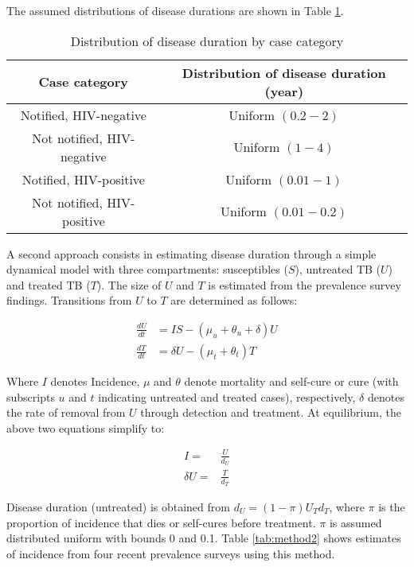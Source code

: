 The assumed distributions of disease durations are shown in Table \ref{tab:duration}.

\begin{table} 
    \label{tab:duration}
    \begin{tabular}{ c c }
        \hline
        Case category & Distribution of disease duration (year) \\ 
        \hline
        Notified, HIV-negative & Uniform $(0.2 - 2)$ \\ 
        Not notified, HIV-negative & Uniform $(1 - 4)$ \\ 
        Notified, HIV-positive & Uniform $(0.01 - 1)$ \\ 
        Not notified, HIV-positive & Uniform $(0.01 - 0.2)$ \\ 
        \hline
    \end{tabular} 
    \caption{Distribution of disease duration by case category} 
\end{table}



A second approach consists in estimating disease duration through a simple dynamical model with three compartments: susceptibles ($S$), untreated TB ($U$) and treated TB ($T$). The size of $U$ and $T$ is estimated from the prevalence survey findings. Transitions from $U$ to $T$ are determined as follows:

\begin{align*}
\frac{dU}{dt} &= I S - (\mu_u + \theta_u + \delta)U \\
\frac{dT}{dt} &= \delta U - (\mu_t + \theta_t) T
\end{align*}

Where $I$ denotes Incidence, $\mu$ and $\theta$ denote mortality and self-cure or cure (with subscripts $u$ and $t$ indicating untreated and treated cases), respectively, $\delta$ denotes the rate of removal from $U$ through detection and treatment. At equilibrium, the above two equations simplify to: 

\begin{align*}
I = &\frac{U}{d_U} \\
\delta U = &\frac{T}{d_T}
\end{align*}

Disease duration (untreated) is obtained from $d_U=(1-\pi)U_T d_T$, where $\pi$ is the proportion of incidence that dies or self-cures before treatment. $\pi$ is assumed distributed uniform with bounds 0 and 0.1. Table \ref{tab:method2} shows estimates of incidence from four recent prevalence surveys using this method. 

